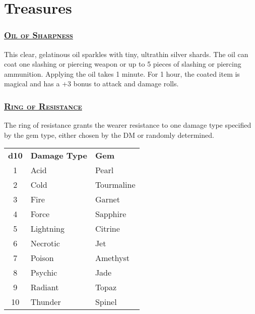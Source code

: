 \section{Treasures}

\begin{multicols*}{2}
	
\subsubsection*{\underline{\textsc{\Large Oil of Sharpness}}}
This clear, gelatinous oil sparkles with tiny, ultrathin silver shards. The oil can coat one slashing or piercing weapon or up to 5 pieces of slashing or piercing ammunition. Applying the oil takes 1 minute. For 1 hour, the coated item is magical and has a +3 bonus to attack and damage rolls.
	
\subsubsection*{\underline{\textsc{\Large Ring of Resistance}}}
The ring of resistance grants the wearer resistance to one damage type specified by the gem type, either chosen by the DM or randomly determined.

\begin{table}[H]
	\begin{tabular}{cll}
		\textbf{d10} & \textbf{Damage Type} & \textbf{Gem} \\
		1 & Acid & Pearl \\
		2 & Cold & Tourmaline \\
		3 & Fire & Garnet \\
		4 & Force & Sapphire \\
		5 & Lightning & Citrine \\
		6 & Necrotic & Jet \\
		7 & Poison & Amethyst \\
		8 & Psychic & Jade \\
		9 & Radiant & Topaz \\
		10 & Thunder & Spinel \\
	\end{tabular}
\end{table}


\end{multicols*}

\pagebreak